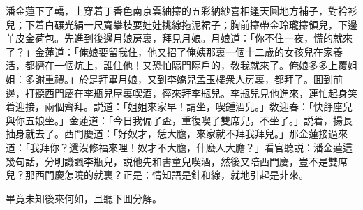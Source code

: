 潘金蓮下了轎，上穿着丁香色南京雲紬㩟的五彩納紗喜相逢天圓地方補子，對衿衫兒；下着白碾光絹一尺寬攀枝耍娃娃挑線拖泥裙子；胸前㩟帶金玲瓏㩟領兒，下邊羊皮金荷包。先進到後邊月娘房裏，拜見月娘。月娘道：「你不住一夜，慌的就來了？」金蓮道：「俺娘要留我住，他又招了俺姨那裏一個十二歲的女孩兒在家養活，都擠在一個炕上，誰住他！又恐怕隔門隔戶的，敎我就來了。俺娘多多上覆姐姐：多謝重禮。」於是拜畢月娘，又到李嬌兒孟玉樓衆人房裏，都拜了。囬到前邊，打聽西門慶在李瓶兒屋裏喫酒，徑來拜李瓶兒。李瓶兒見他進來，連忙起身笑着迎接，兩個齊拜。説道：「姐姐來家早！請坐，喫鍾酒兒。」敎迎春：「快㧱座兒與你五娘坐。」金蓮道：「今日我偏了盃，重復喫了雙席兒，不坐了。」説着，揚長抽身就去了。西門慶道：「好奴才，恁大膽，來家就不拜我拜兒。」那金蓮接過來道：「我拜你？還沒修福來哩！奴才不大膽，什麽人大膽？」看官聽説：潘金蓮這幾句話，分明譏諷李瓶兒，説他先和書童兒喫酒，然後又陪西門慶，豈不是雙席兒？那西門慶怎曉的就裏？正是：情知語是針和線，就地引起是非來。

畢竟未知後來何如，且聽下囬分解。

